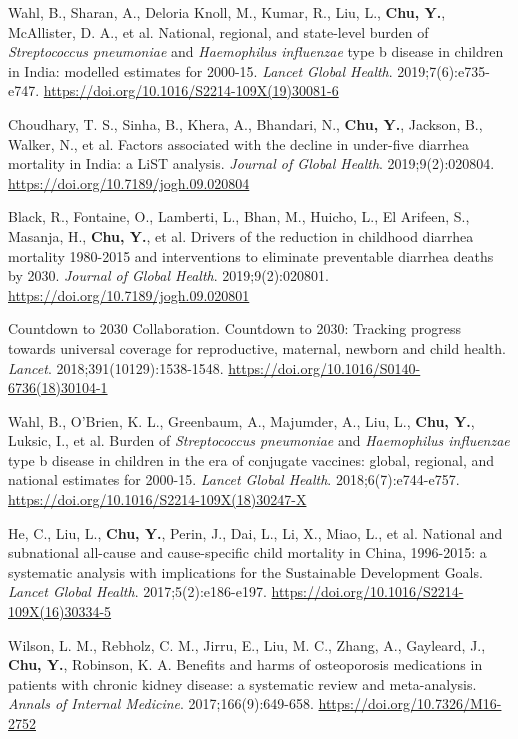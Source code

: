 \documentclass[
  11pt,
  letterpaper,
]{article}
\begin{document}
\begin{etaremune}
\item Wahl, B., Sharan, A., Deloria Knoll, M., Kumar, R., Liu, L., \textbf{Chu, Y.}, McAllister, D. A., et al. National, regional, and state-level burden of \emph{Streptococcus pneumoniae} and \emph{Haemophilus influenzae} type b disease in children in India: modelled estimates for 2000-15. \emph{Lancet Global Health}. 2019;7(6):e735-e747. \url{https://doi.org/10.1016/S2214-109X(19)30081-6}
\item Choudhary, T. S., Sinha, B., Khera, A., Bhandari, N., \textbf{Chu, Y.}, Jackson, B., Walker, N., et al. Factors associated with the decline in under-five diarrhea mortality in India: a LiST analysis. \emph{Journal of Global Health}. 2019;9(2):020804. \url{https://doi.org/10.7189/jogh.09.020804}
\item Black, R., Fontaine, O., Lamberti, L., Bhan, M., Huicho, L., El Arifeen, S., Masanja, H., \textbf{Chu, Y.}, et al. Drivers of the reduction in childhood diarrhea mortality 1980-2015 and interventions to eliminate preventable diarrhea deaths by 2030. \emph{Journal of Global Health}. 2019;9(2):020801. \url{https://doi.org/10.7189/jogh.09.020801}
\item Countdown to 2030 Collaboration. Countdown to 2030: Tracking progress towards universal coverage for reproductive, maternal, newborn and child health. \emph{Lancet}. 2018;391(10129):1538-1548. \url{https://doi.org/10.1016/S0140-6736(18)30104-1}
\item Wahl, B., O'Brien, K. L., Greenbaum, A., Majumder, A., Liu, L., \textbf{Chu, Y.}, Luksic, I., et al. Burden of \emph{Streptococcus pneumoniae} and \emph{Haemophilus influenzae} type b disease in children in the era of conjugate vaccines: global, regional, and national estimates for 2000-15. \emph{Lancet Global Health}. 2018;6(7):e744-e757. \url{https://doi.org/10.1016/S2214-109X(18)30247-X}
\item He, C., Liu, L., \textbf{Chu, Y.}, Perin, J., Dai, L., Li, X., Miao, L., et al. National and subnational all-cause and cause-specific child mortality in China, 1996-2015: a systematic analysis with implications for the Sustainable Development Goals. \emph{Lancet Global Health}. 2017;5(2):e186-e197. \url{https://doi.org/10.1016/S2214-109X(16)30334-5}
\item Wilson, L. M., Rebholz, C. M., Jirru, E., Liu, M. C., Zhang, A., Gayleard, J., \textbf{Chu, Y.}, Robinson, K. A. Benefits and harms of osteoporosis medications in patients with chronic kidney disease: a systematic review and meta-analysis. \emph{Annals of Internal Medicine}. 2017;166(9):649-658. \url{https://doi.org/10.7326/M16-2752}

\end{etaremune}
\end{document}
